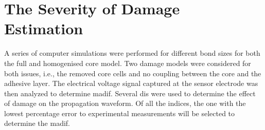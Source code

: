 \chapter[The Severity of Damage Estimation]{The Severity of Damage Estimation}
\label{ch:severity}

A series of computer simulations were performed for different bond sizes for both the full and homogenised core model.
Two damage models were considered for both issues, i.e., the removed core cells  and no coupling between the core and the adhesive layer.
The electrical voltage signal captured at the sensor electrode was then analyzed to determine \ac{madif}.
Several \acp{di} were used to determine the effect of damage on the propagation waveform.
Of all the indices, the one with the lowest percentage error to experimental measurements will be selected to determine the \ac{madif}.



%
